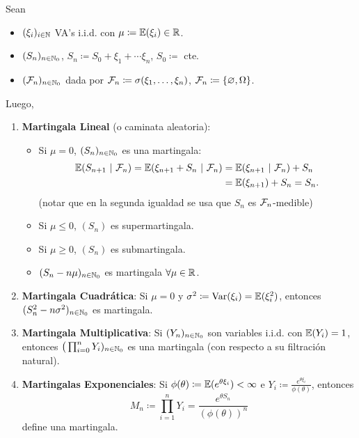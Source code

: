 \begin{eg}
	Sean
	\begin{itemize}
		\item $(\xi_{i})_{i \in \mathbb{N}}$ VA's i.i.d. con $\mu \coloneq \mathbb{E}(\xi_{i}) \in \mathbb{R}$.

		\item $(S_{n})_{n \in \mathbb{N}_{0}}$, $S_{n} \coloneq S_{0} + \xi_{1} + \cdots \xi_{n}$, $S_{0} \coloneq$ cte.
		
		\item $(\mathcal{F}_{n})_{n \in \mathbb{N}_{0}}$ dada por $\mathcal{F}_{n} \coloneq \sigma(\xi_{1}, \dots, \xi_{n})$, $\mathcal{F}_{n} \coloneq \{\varnothing, \Omega\}$. 
	\end{itemize}
	Luego,
	\begin{enumerate}
		\item \textbf{Martingala Lineal} (o caminata aleatoria):
		\begin{itemize}
			\item Si $\mu = 0$, $(S_{n})_{n \in \mathbb{N}_{0}}$ es una martingala:
			\begin{align*}
				\mathbb{E}(S_{n+1} \ | \ \mathcal{F}_{n}) = \mathbb{E}(\xi_{n+1} + S_{n} \ | \ \mathcal{F}_{n}) &= \mathbb{E}(\xi_{n+1} \ | \ \mathcal{F}_{n}) + S_{n} \\
				 &= \mathbb{E}(\xi_{n+1}) + S_{n} = S_{n}
			.\end{align*}
			(notar que en la segunda igualdad se usa que $S_{n}$ es $\mathcal{F}_{n}$-medible)

			\item Si $\mu \leq 0$, $(S_{n})$ es supermartingala.

			\item Si $\mu \geq 0$, $(S_{n})$ es submartingala.

			\item $(S_{n} - n\mu)_{n \in \mathbb{N}_{0}}$ es martingala $\forall \mu \in \mathbb{R}$.
		\end{itemize}

		\item \textbf{Martingala Cuadrática}: Si $\mu = 0$ y $\sigma^{2} \coloneq \operatorname{Var}(\xi_{i}) = \mathbb{E}(\xi_{i}^{2})$, entonces $(S_{n}^{2} - n\sigma^{2})_{n \in \mathbb{N}_{0}}$ es martingala.

		\item \textbf{Martingala Multiplicativa}: Si $(Y_{n})_{n \in \mathbb{N}_{0}}$ son variables i.i.d. con $\mathbb{E}(Y_{i}) = 1$, entonces $\big( \prod_{i=0}^{n} Y_{i})_{n \in \mathbb{N}_{0}}$ es una martingala (con respecto a su filtración natural).

		\item \textbf{Martingalas Exponenciales}: Si $\phi(\theta) \coloneq \mathbb{E}(e^{\theta \xi_{i}}) < \infty$ e $Y_{i} \coloneq \frac{e^{\theta \xi_{i}}}{\phi(\theta)}$, entonces 
		\[ M_{n} \coloneq \prod_{i=1}^{n} Y_{i} = \frac{e^{\theta S_{n}}}{(\phi(\theta))^{n}} \]
		define una martingala.


\end{enumerate}
\end{eg}

